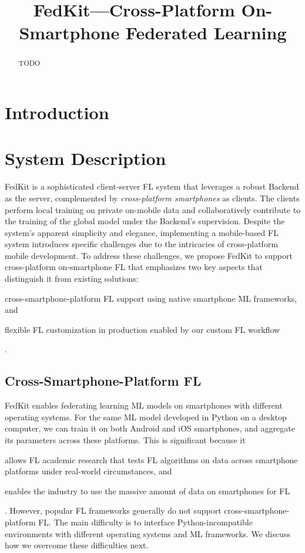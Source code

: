 \documentclass[letterpaper]{article} %
\title{FedKit---Cross-Platform On-Smartphone Federated Learning}
\author{}
\begin{document}
\maketitle

\begin{abstract}
    TODO
\end{abstract}

\section{Introduction}


\section{System Description}

FedKit is a sophisticated client-server FL system that leverages a robust Backend as the server, complemented by \textit{cross-platform smartphones} as clients.
The clients perform local training on private on-mobile data and collaboratively contribute to the training of the global model under the Backend's supervision.
Despite the system's apparent simplicity and elegance, implementing a mobile-based FL system introduces specific challenges due to the intricacies of cross-platform mobile development.
To address these challenges, we propose FedKit to support cross-platform on-smartphone FL that emphasizes two key aspects that distinguish it from existing solutions:
\begin{enumerate*}[label=\arabic*)]
    \item cross-smartphone-platform FL support using
        native smartphone ML frameworks, and
    \item flexible FL customization in production enabled by
        our custom FL workflow
\end{enumerate*}.

\subsection{Cross-Smartphone-Platform FL}
FedKit enables federating learning ML models on smartphones
with different operating systems.
For the same ML model developed in Python on a desktop computer,
we can train it on both Android and iOS smartphones,
and aggregate its parameters across these platforms.
This is significant because it
\begin{enumerate*}[label=\arabic*)]
    \item allows FL academic research that tests FL algorithms
        on data across smartphone platforms under real-world circumstances, and
    \item enables the industry to use the massive amount of data on smartphones
        for FL
\end{enumerate*}.
However, popular FL frameworks generally do not support
cross-smartphone-platform FL.
The main difficulty is to interface
Python-incompatible environments with different operating systems and
ML frameworks.
We discuss how we overcome these difficulties next.
\end{document}
